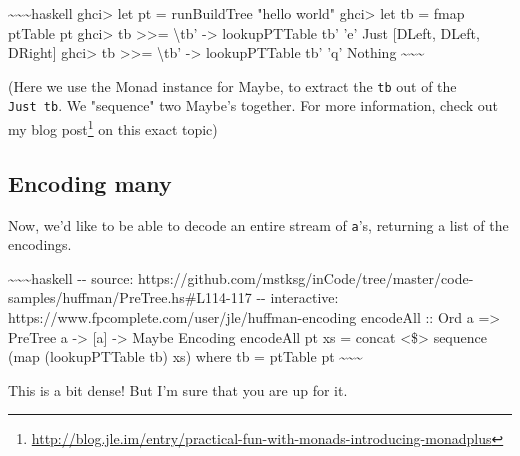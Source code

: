 \documentclass[]{article}
\renewcommand{\href}[2]{#2\footnote{\url{#1}}}
\begin{document}
\textasciitilde{}\textasciitilde{}\textasciitilde{}haskell ghci\textgreater{}
let pt = runBuildTree "hello world" ghci\textgreater{} let tb = fmap ptTable pt
ghci\textgreater{} tb \textgreater{}\textgreater{}= \textbackslash{}tb'
-\textgreater{} lookupPTTable tb' 'e' Just {[}DLeft, DLeft, DRight{]}
ghci\textgreater{} tb \textgreater{}\textgreater{}= \textbackslash{}tb'
-\textgreater{} lookupPTTable tb' 'q' Nothing
\textasciitilde{}\textasciitilde{}\textasciitilde{}

(Here we use the Monad instance for Maybe, to extract the
\texttt{tb\textquotesingle{}} out of the \texttt{Just\ tb}. We "sequence" two
Maybe's together. For more information, check out my
\href{http://blog.jle.im/entry/practical-fun-with-monads-introducing-monadplus}{blog
post} on this exact topic)

\subsection{Encoding many}

Now, we'd like to be able to decode an entire stream of \texttt{a}'s, returning
a list of the encodings.

\textasciitilde{}\textasciitilde{}\textasciitilde{}haskell -\/- source:
https://github.com/mstksg/inCode/tree/master/code-samples/huffman/PreTree.hs\#L114-117
-\/- interactive: https://www.fpcomplete.com/user/jle/huffman-encoding encodeAll
:: Ord a =\textgreater{} PreTree a -\textgreater{} {[}a{]} -\textgreater{} Maybe
Encoding encodeAll pt xs = concat \textless{}\$\textgreater{} sequence (map
(lookupPTTable tb) xs) where tb = ptTable pt
\textasciitilde{}\textasciitilde{}\textasciitilde{}

This is a bit dense! But I'm sure that you are up for it.
\end{document}
